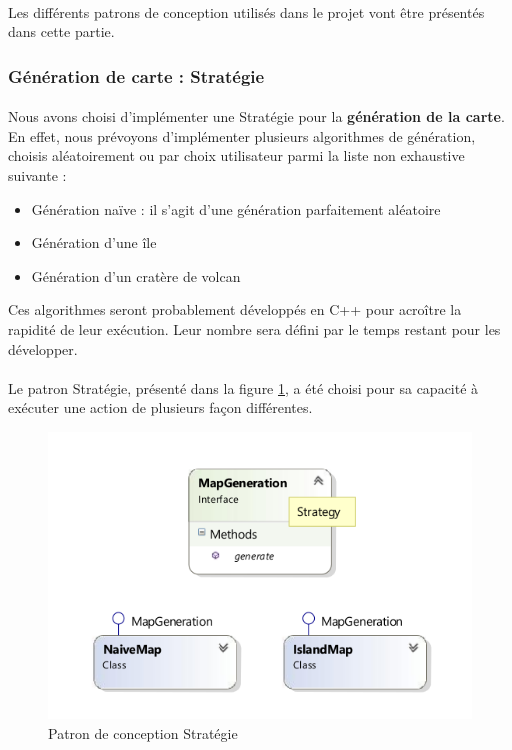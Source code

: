 \paragraph{}
Les différents patrons de conception utilisés dans le projet vont être présentés dans cette partie.

\subsubsection{Génération de carte : Stratégie}

\paragraph{}
Nous avons choisi d'implémenter une Stratégie pour la \textbf{génération de la carte}.
En effet, nous prévoyons d'implémenter plusieurs algorithmes de génération, choisis aléatoirement ou par choix utilisateur parmi la liste non exhaustive suivante :

\begin{itemize}
  \item Génération naïve : il s'agit d'une génération parfaitement aléatoire
  \item Génération d'une île
  \item Génération d'un cratère de volcan
\end{itemize}

Ces algorithmes seront probablement développés en C++ pour acroître la rapidité de leur exécution.
Leur nombre sera défini par le temps restant pour les développer.

\paragraph{}
Le patron Stratégie, présenté dans la figure \ref{fig:strategy}, a été choisi pour sa capacité à exécuter une action de plusieurs façon différentes.

\begin{figure}[h]
  \centering
  \includegraphics[width=13cm]{schemas/dp_strategy.png}
  \caption{Patron de conception Stratégie}
  \label{fig:strategy}
\end{figure}

